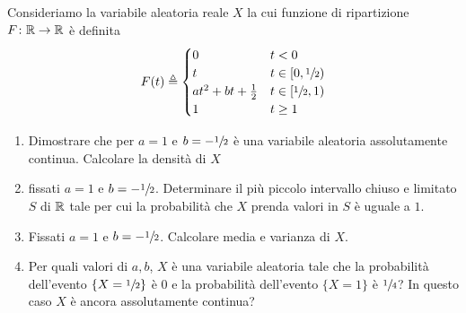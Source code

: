 \documentclass[a4paper]{article}
\begin{document}
\begin{snippetexercise}{}
    Consideriamo la variabile aleatoria reale \(X\) la cui funzione di ripartizione \(F \colon \mathbb{R} \to \mathbb{R}\)
    è definita \[
        F(t) \triangleq
        \begin{cases}
            0 & t < 0 \\
            t & t \in [0, \sfrac12) \\
            at^2 + bt + \frac12 & t \in [\sfrac12, 1) \\
            1 & t \geq 1
        \end{cases}
    \]
    \begin{enumerate}
        \item Dimostrare che per \(a=1\) e \(b=-\sfrac12\) è una variabile aleatoria assolutamente continua.
            Calcolare la densità di \(X\)
        \item fissati \(a = 1\) e \(b = -\sfrac12\). Determinare il più piccolo intervallo chiuso
            e limitato \(S\) di \(\mathbb{R}\) tale per cui la probabilità che \(X\)
            prenda valori in \(S\) è uguale a \(1\).
        \item Fissati \(a=1\) e \(b= -\sfrac12\). Calcolare media e varianza di \(X\).
        \item Per quali valori di \(a, b\), \(X\) è una variabile aleatoria tale che la probabilità
            dell'evento \(\{X = \sfrac12\}\) è 0 e la probabilità dell'evento
            \(\{X=1\}\) è \(\sfrac14\)? In questo caso \(X\) è ancora assolutamente continua?
    \end{enumerate}
\end{snippetexercise}
\end{document}

